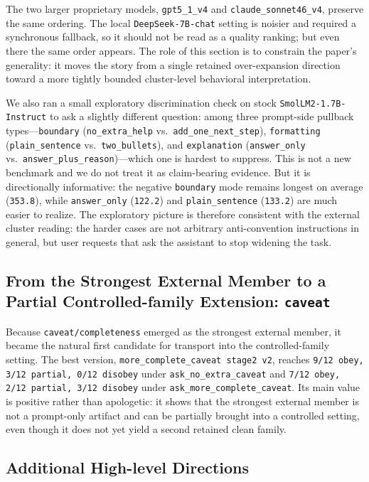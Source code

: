 \documentclass[11pt]{article}
\begin{document}
The two larger proprietary models, \texttt{gpt5\_1\_v4} and \texttt{claude\_sonnet46\_v4}, preserve the same ordering. The local \texttt{DeepSeek-7B-chat} setting is noisier and required a synchronous fallback, so it should not be read as a quality ranking; but even there the same order appears. The role of this section is to constrain the paper's generality: it moves the story from a single retained over-expansion direction toward a more tightly bounded cluster-level behavioral interpretation.

We also ran a small exploratory discrimination check on stock \texttt{SmolLM2-1.7B-Instruct} to ask a slightly different question: among three prompt-side pullback types---\texttt{boundary} (\texttt{no\_extra\_help} vs.\ \texttt{add\_one\_next\_step}), \texttt{formatting} (\texttt{plain\_sentence} vs.\ \texttt{two\_bullets}), and \texttt{explanation} (\texttt{answer\_only} vs.\ \texttt{answer\_plus\_reason})---which one is hardest to suppress. This is not a new benchmark and we do not treat it as claim-bearing evidence. But it is directionally informative: the negative \texttt{boundary} mode remains longest on average (\texttt{353.8}), while \texttt{answer\_only} (\texttt{122.2}) and \texttt{plain\_sentence} (\texttt{133.2}) are much easier to realize. The exploratory picture is therefore consistent with the external cluster reading: the harder cases are not arbitrary anti-convention instructions in general, but user requests that ask the assistant to stop widening the task.

\subsection{From the Strongest External Member to a Partial Controlled-family Extension: \texttt{caveat}}

Because \texttt{caveat/completeness} emerged as the strongest external member, it became the natural first candidate for transport into the controlled-family setting. The best version, \texttt{more\_complete\_caveat stage2 v2}, reaches \texttt{9/12 obey, 3/12 partial, 0/12 disobey} under \texttt{ask\_no\_extra\_caveat} and \texttt{7/12 obey, 2/12 partial, 3/12 disobey} under \texttt{ask\_more\_complete\_caveat}. Its main value is positive rather than apologetic: it shows that the strongest external member is not a prompt-only artifact and can be partially brought into a controlled setting, even though it does not yet yield a second retained clean family.

\subsection{Additional High-level Directions}
\end{document}
